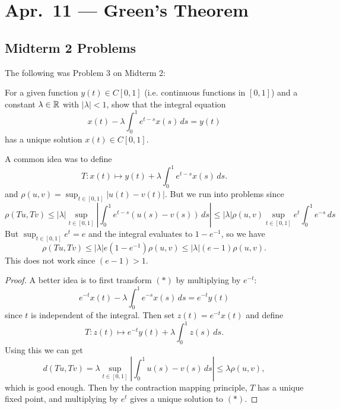 \chapter{Apr.~11 --- Green's Theorem}

\section{Midterm 2 Problems}
The following was Problem 3 on Midterm 2:
\begin{exercise}
  For a given function $y(t) \in C[0, 1]$ (i.e. continuous
  functions in $[0, 1]$) and a constant $\lambda \in \mathbb{R}$
  with $|\lambda| < 1$, show that the integral equation
  \[
    x(t) - \lambda \int_0^1 e^{t - s} x(s)\, ds = y(t) \tag{$*$}
  \]
  has a unique solution $x(t) \in C[0, 1]$.
\end{exercise}

\begin{remark}
  A common idea was to define
  \[
    T : x(t) \mapsto y(t) + \lambda \int_0^1 e^{t - s} x(s)\, ds.
  \]
  and $\rho(u, v) = \sup_{t \in [0, 1]} |u(t) - v(t)|$.
  But we run into problems since
  \[
    \rho(Tu, Tv)
    \le |\lambda| \sup_{t \in [0, 1]} \left| \int_0^1 e^{t - s} (u(s) - v(s))\, ds \right|
    \le |\lambda| \rho(u, v) \sup_{t \in [0, 1]} e^t \int_0^1 e^{-s}\, ds
  \]
  But $\sup_{t \in [0, 1]} e^t = e$ and the integral
  evaluates to $1 - e^{-1}$, so we have
  \[
    \rho(Tu, Tv) \le |\lambda| e (1 - e^{-1}) \rho(u, v)
    \le |\lambda| (e - 1) \rho(u, v).
  \]
  This does not work since $(e - 1) > 1$.
\end{remark}

\begin{proof}
  A better idea is to first transform $(*)$ by
  multiplying by $e^{-t}$:
  \[
    e^{-t} x(t) - \lambda \int_0^1 e^{-s} x(s)\, ds = e^{-t} y(t)
  \]
  since $t$ is independent of the integral. Then set
  $z(t) = e^{-t} x(t)$ and define
  \[
    T : z(t) \mapsto e^{-t} y(t) + \lambda \int_0^1 z(s)\, ds.
  \]
  Using this we can get
  \[
    d(Tu, Tv) = \lambda \sup_{t \in [0, 1]} \left|\int_0^1 u(s) - v(s)\, ds\right|
    \le \lambda \rho(u, v),
  \]
  which is good enough. Then by the contraction
  mapping principle, $T$ has a unique fixed point, and
  multiplying by $e^t$ gives a unique solution to $(*)$.
\end{proof}

